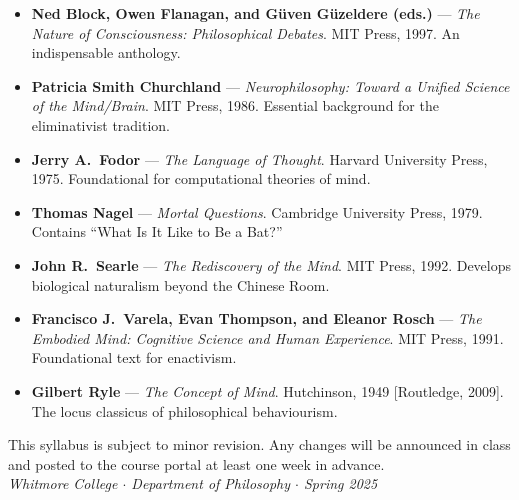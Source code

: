\documentclass[11pt, a4paper]{article}
\newcommand{\reading}[3]{%
  \item \textbf{#1} — \textit{#2}. #3%
}
\begin{document}
\begin{itemize}[leftmargin=*, itemsep=3pt]
  \reading{Ned Block, Owen Flanagan, and Güven Güzeldere (eds.)}{The Nature of Consciousness: Philosophical Debates}
          {MIT Press, 1997. An indispensable anthology.}
  \reading{Patricia Smith Churchland}{Neurophilosophy: Toward a Unified Science of the Mind/Brain}
          {MIT Press, 1986. Essential background for the eliminativist tradition.}
  \reading{Jerry A.\ Fodor}{The Language of Thought}
          {Harvard University Press, 1975. Foundational for computational theories of mind.}
  \reading{Thomas Nagel}{Mortal Questions}
          {Cambridge University Press, 1979. Contains ``What Is It Like to Be a Bat?''}
  \reading{John R.\ Searle}{The Rediscovery of the Mind}
          {MIT Press, 1992. Develops biological naturalism beyond the Chinese Room.}
  \reading{Francisco J.\ Varela, Evan Thompson, and Eleanor Rosch}{The Embodied Mind: Cognitive Science and Human Experience}
          {MIT Press, 1991. Foundational text for enactivism.}
  \reading{Gilbert Ryle}{The Concept of Mind}
          {Hutchinson, 1949 [Routledge, 2009]. The locus classicus of philosophical behaviourism.}
\end{itemize}

\vspace{8pt}
\begin{center}
  {\small\color{muted}
    This syllabus is subject to minor revision. Any changes will be announced in class and
    posted to the course portal at least one week in advance.\\[2pt]
    \textit{Whitmore College $\cdot$ Department of Philosophy $\cdot$ Spring 2025}}
\end{center}
\end{document}
